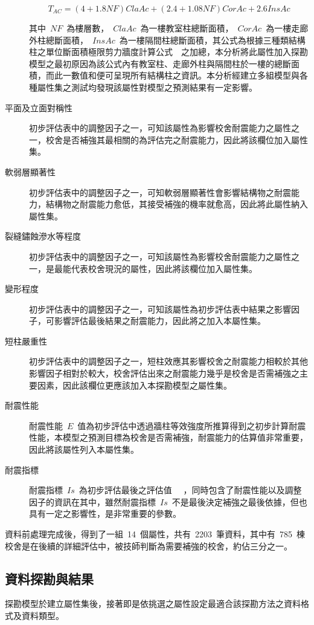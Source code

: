 \begin{description}
  \begin{equation}T_{AC} = (4+1.8NF) ClaAc+(2.4+1.08NF) CorAc+2.6 InsAc \end{equation} 

  其中~$NF$~為樓層數，~$ClaAc$~為一樓教室柱總斷面積，~$CorAc$~為一樓走廊外柱總斷面積，~$InsAc$~為一樓隔間柱總斷面積，其公式為根據三種類結構柱之單位斷面積極限剪力牆度計算公式~\cite{su2008master}~之加總，本分析將此屬性加入探勘模型之最初原因為該公式內有教室柱、走廊外柱與隔間柱於一樓的總斷面積，而此一數值和便可呈現所有結構柱之資訊。本分析經建立多組模型與各種屬性集之測試均發現該屬性對模型之預測結果有一定影響。
\item [平面及立面對稱性]
初步評估表中的調整因子之一，可知該屬性為影響校舍耐震能力之屬性之一，校舍是否補強其最相關的為評估完之耐震能力，因此將該欄位加入屬性集。
\item [軟弱層顯著性]
初步評估表中的調整因子之一，可知軟弱層顯著性會影響結構物之耐震能力，結構物之耐震能力愈低，其接受補強的機率就愈高，因此將此屬性納入屬性集。
\item [裂縫鏽蝕滲水等程度]
初步評估表中的調整因子之一，可知該屬性為影響校舍耐震能力之屬性之一，是最能代表校舍現況的屬性，因此將該欄位加入屬性集。
\item [變形程度]
初步評估表中的調整因子之一，可知該屬性為初步評估表中結果之影響因子，可影響評估最後結果之耐震能力，因此將之加入本屬性集。
\item [短柱嚴重性]
初步評估表中的調整因子之一，短柱效應其影響校舍之耐震能力相較於其他影響因子相對於較大，校舍評估出來之耐震能力幾乎是校舍是否需補強之主要因素，因此該欄位更應該加入本探勘模型之屬性集。
\item [耐震性能]
耐震性能~$E$~值為初步評估中透過牆柱等效強度所推算得到之初步計算耐震性能，本模型之預測目標為校舍是否需補強，耐震能力的估算值非常重要，因此將該屬性列入本屬性集。
\item [耐震指標]
耐震指標~$Is$~為初步評估最後之評估值~\cite{ncree03049} ~，同時包含了耐震性能以及調整因子的資訊在其中，雖然耐震指標~$Is$~不是最後決定補強之最後依據，但也具有一定之影響性，是非常重要的參數。
\end{description}

資料前處理完成後，得到了一組~14~個屬性，共有~2203~筆資料，其中有~785~棟校舍是在後續的詳細評估中，被技師判斷為需要補強的校舍，約佔三分之一。

\subsection{資料探勘與結果}

探勘模型於建立屬性集後，接著即是依挑選之屬性設定最適合該探勘方法之資料格式及資料類型。

